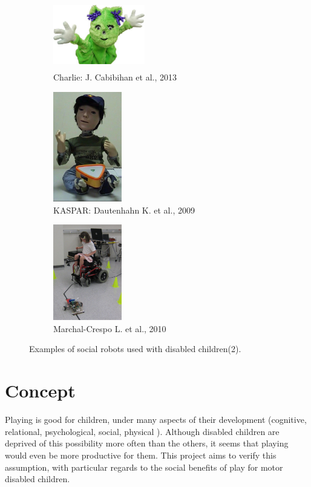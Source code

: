 \documentclass[a4paper,twoside]{book}
\begin{document}
\begin{figure}[b]

\begin{subfigure}{4.5cm}
\includegraphics[width=4cm, height=3cm]{img/Cabibihan}
\captionsetup{width=4cm}
\caption{Charlie: J. Cabibihan et al., 2013}
\end{subfigure}
\begin{subfigure}{4cm}
\includegraphics[width= 3cm]{img/Dautenhahn}
\captionsetup{width=3cm}
\caption{KASPAR: Dautenhahn K. et al., 2009}
\end{subfigure}
\begin{subfigure}{4cm}
\includegraphics[width=3cm]{img/Marchal-Crespo}
\captionsetup{width=3cm}
\caption{Marchal-Crespo L. et al., 2010}
\end{subfigure}

\caption{Examples of social robots used with disabled children(2).}
\end{figure}
 
\section{Concept}

Playing is good for children, under many aspects of their development (cognitive, relational, psychological, social, physical \textellipsis). Although disabled children are deprived of this possibility more often than the others, it seems that playing would even be more productive for them.
This project aims to verify this assumption, with particular regards to the social benefits of play for motor disabled children.
\end{document}
